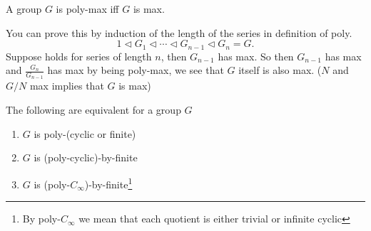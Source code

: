 

\begin{eg}
    A group $G$ is poly-max iff $G$ is max.
\end{eg}
\begin{explanation}
    You can prove this by induction of the length of the series in definition of poly.
    \[
    1 \triangleleft  G_1 \triangleleft  \cdots \triangleleft  G_{n-1} \triangleleft G_n = G
    .\] 
    Suppose holds for series of length $n$, then $G_{n-1}$ has max. So then $G_{n-1}$ has max and $\frac{G_n}{G_{n-1}}$ has max by being poly-max, we see that $G$ itself is also max. ($N$ and $G / N$ max implies that $G$ is max)
\end{explanation}


\begin{prop}
    The following are equivalent for a group $G$ 
    \begin{enumerate}[(1)]
        \item $G$ is poly-(cyclic or finite)
        \item $G$ is (poly-cyclic)-by-finite
        \item $G$ is (poly-$C_{\infty}$)-by-finite\footnote{By poly-$C_{\infty}$ we mean that each quotient is either trivial or infinite cyclic}
    \end{enumerate}
\end{prop}
